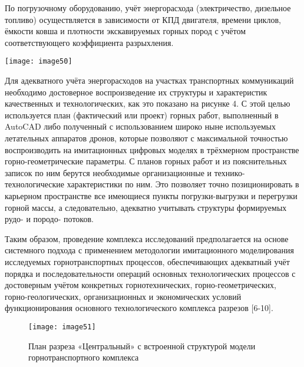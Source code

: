 \begin{multicols}{2}
По погрузочному оборудованию, учёт энергорасхода (электричество,
дизельное топливо) осуществляется в зависимости от КПД двигателя,
времени циклов, ёмкости ковша и плотности экскавируемых горных пород с
учётом соответствующего коэффициента разрыхления.

{\centering
    \texttt{[image: image50]}
    }

Для адекватного учёта энергорасходов на участках транспортных
коммуникаций необходимо достоверное воспроизведение их структуры и
характеристик качественных и технологических, как это показано на
рисунке 4. С этой целью используется план (фактический или проект)
горных работ, выполненный в AutoCAD либо полученный с использованием
широко ныне используемых летательных аппаратов дронов, которые позволяют
с максимальной точностью воспроизводить на имитационных цифровых моделях
в трёхмерном пространстве горно-геометрические параметры. С планов
горных работ и из пояснительных записок по ним берутся необходимые
организационные и технико-технологические характеристики по ним. Это
позволяет точно позиционировать в карьерном пространстве все имеющиеся
пункты погрузки-выгрузки и перегрузки горной массы, а следовательно,
адекватно учитывать структуры формируемых рудо- и породо- потоков.

Таким образом, проведение комплекса исследований предполагается на
основе системного подхода с применением методологии имитационного
моделирования исследуемых горнотранспортных процессов, обеспечивающих
адекватный учёт порядка и последовательности операций основных
технологических процессов с достоверным учётом конкретных
горнотехнических, горно-геометрических, горно-геологических,
организационных и экономических условий функционирования основного
технологического комплекса разрезов {[}6-10{]}.
\end{multicols}

\begin{figure}[H]
    \centering
    \texttt{[image: image51]}
    \caption{План разреза «Центральный» с встроенной структурой модели горнотранспортного комплекса}
\end{figure}

